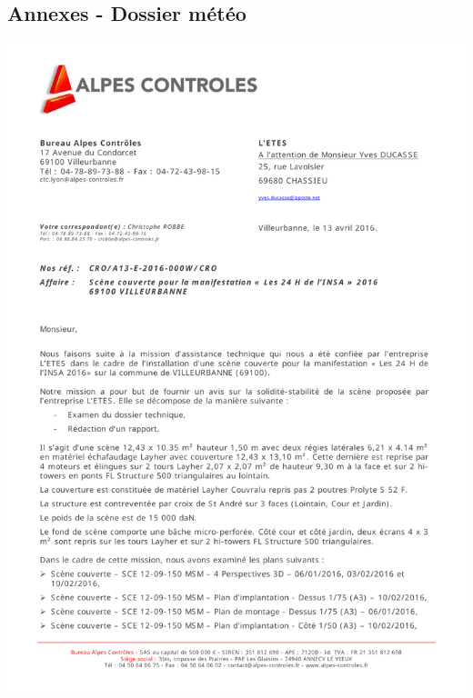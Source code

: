 \documentclass[hidelinks, paper=a4, fontsize=13pt]{report}
\begin{document}
\subsection{Annexes - Dossier météo}
\begin{center}
	\includegraphics[page=1,scale=0.7]{Annexes/Documents/StabiliteGrandeScene}
	\label{refVentGS}
\end{center}
\end{document}
